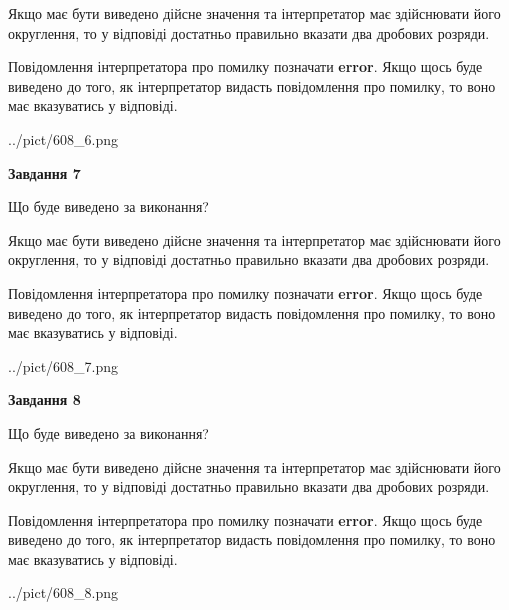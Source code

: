 \documentclass[12pt, ukrainian]{article}
\begin{document}
{\begin {Large}
Якщо має бути виведено дійсне значення та інтерпретатор має здійснювати його округлення, 
то у відповіді достатньо правильно вказати два дробових розряди.

Повідомлення інтерпретатора про помилку позначати \textbf{error}.
Якщо щось буде виведено до того, як інтерпретатор видасть повідомлення про помилку, 
то воно має вказуватись у відповіді. \par

\begin{center}
	{../pict/608_6.png}
\end{center}
\newpage

{\begin {center}\textbf{Завдання 7}\end {center}}\par
Що буде виведено за виконання? \par

Якщо має бути виведено дійсне значення та інтерпретатор має здійснювати його округлення, 
то у відповіді достатньо правильно вказати два дробових розряди.

Повідомлення інтерпретатора про помилку позначати \textbf{error}.
Якщо щось буде виведено до того, як інтерпретатор видасть повідомлення про помилку, 
то воно має вказуватись у відповіді. \par

\begin{center}
	{../pict/608_7.png}
\end{center}
\newpage

{\begin {center}\textbf{Завдання 8}\end {center}}\par
Що буде виведено за виконання? \par

Якщо має бути виведено дійсне значення та інтерпретатор має здійснювати його округлення, 
то у відповіді достатньо правильно вказати два дробових розряди.

Повідомлення інтерпретатора про помилку позначати \textbf{error}.
Якщо щось буде виведено до того, як інтерпретатор видасть повідомлення про помилку, 
то воно має вказуватись у відповіді. \par

\begin{center}
	{../pict/608_8.png}
\end{center}
\newpage


\end{Large}}
\end{document}
